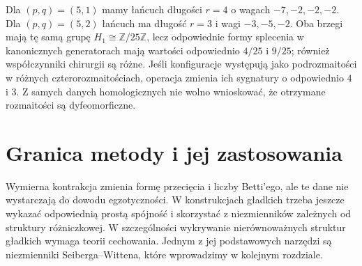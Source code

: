 \begin{przyklad}
Dla $(p,q)=(5,1)$ mamy łańcuch długości $r=4$ o wagach
$-7,-2,-2,-2$. Dla $(p,q)=(5,2)$ łańcuch ma długość
$r=3$ i wagi $-3,-5,-2$. Oba brzegi mają tę samą grupę
$H_1\cong\mathbb Z/25\mathbb Z$, lecz odpowiednie formy
splecenia w kanonicznych generatorach mają wartości
odpowiednio $4/25$ i $9/25$; również współczynniki chirurgii
są różne. Jeśli konfiguracje występują jako podrozmaitości
w różnych czterorozmaitościach, operacja zmienia ich sygnatury
o odpowiednio $4$ i $3$. Z samych danych homologicznych
nie wolno wnioskować, że otrzymane rozmaitości są dyfeomorficzne.
\end{przyklad}

\begin{center}
\end{center}

\section{Granica metody i jej zastosowania}
\label{sec:tg-general-limit}

Wymierna kontrakcja zmienia formę przecięcia i liczby Betti'ego,
ale te dane nie wystarczają do dowodu egzotyczności.
W konstrukcjach gładkich trzeba jeszcze wykazać odpowiednią
prostą spójność i skorzystać z niezmienników zależnych od
struktury różniczkowej. W szczególności wykrywanie
nierównoważnych struktur gładkich wymaga teorii cechowania.
Jednym z jej podstawowych narzędzi są niezmienniki
Seiberga--Wittena, które wprowadzimy w kolejnym rozdziale.

